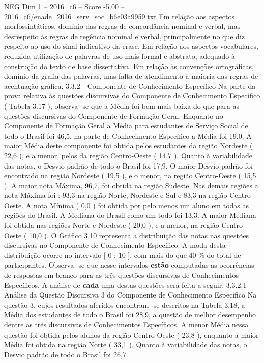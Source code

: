 \begin{textsample}{NEG Dim 1 – 2016\_c6 – Score -5.00 – 2016\_c6/enade\_2016\_serv\_soc\_b6e03a9959.txt}
Em relação aos aspectos morfossintáticos, domínio das regras de concordância nominal e verbal, mas desrespeito às regras de regência nominal e verbal, principalmente no que diz respeito ao uso do sinal indicativo da crase.
Em relação aos aspectos vocabulares, reduzida utilização de palavras de uso mais formal e abstrato, adequado à construção do texto de base dissertativa.
Em relação às convenções ortográficas, domínio da grafia das palavras, mas falta de atendimento à maioria das regras de acentuação gráfica. 3.3.2 - Componente de Conhecimento Específico Na parte da prova relativa às questões discursivas do Componente de Conhecimento Específico ( Tabela 3.17 ), observa -se que a Média foi bem mais baixa do que para as questões discursivas do Componente de Formação Geral.
Enquanto no Componente de Formação Geral a Média para estudantes de Serviço Social de todo o Brasil foi 46,5, na parte de Conhecimento Específico a Média foi 19,0.
A maior Média deste componente foi obtida pelos estudantes da região Nordeste ( 22,6 ), e a menor, pelos da região Centro-Oeste ( 14,7 ).
Quanto à variabilidade das notas, o Desvio padrão de todo o Brasil foi 17,9.
O maior Desvio padrão foi encontrado na região Nordeste ( 19,5 ), e o menor, na região Centro-Oeste ( 15,5 ).
A maior nota Máxima, 96,7, foi obtida na região Sudeste.
Nas demais regiões a nota Máxima foi : 93,3 na região Norte, Nordeste e Sul e 83,3 na região Centro-Oeste.
A nota Mínima ( 0,0 ) foi obtida por pelo menos um aluno em todas as regiões do Brasil.
A Mediana do Brasil como um todo foi 13,3.
A maior Mediana foi obtida nas regiões Norte e Nordeste ( 20,0 ), e a menor, na região Centro-Oeste ( 10,0 ).
O Gráfico 3.10 representa a distribuição das notas nas questões discursivas no Componente de Conhecimento Específico.
A moda desta distribuição ocorre no intervalo [ 0 ; 10 ], com mais do que 40 \% do total de participantes.
Observa -se que nesse intervalos \textbf{estão} computadas as ocorrências de respostas em branco para as três questões discursivas de Conhecimentos Específicos.
A análise de \textbf{cada} uma destas questões será feita a seguir. 3.3.2.1 - Análise da Questão Discursiva 3 do Componente de Conhecimento Específico Na questão 3, cujos resultados aferidos encontram -se descritos na Tabela 3.18, a Média dos estudantes de todo o Brasil foi 28,9, a questão de melhor desempenho dentre as três discursivas de Conhecimentos Específicos.
A menor Média nessa questão foi obtida pelos alunos da região Centro-Oeste ( 23,8 ), enquanto a maior Média foi obtida na região Norte ( 33,1 ).
Quanto à variabilidade das notas, o Desvio padrão de todo o Brasil foi 26,7.

\end{textsample}
